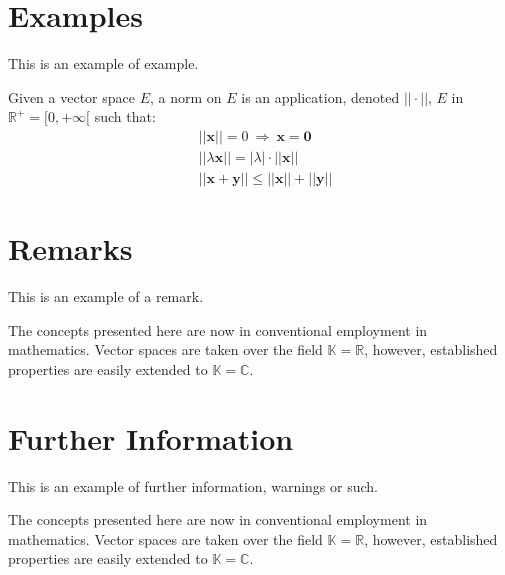 \documentclass{udc-book}
\begin{document}

\section{Examples}

This is an example of example.

\begin{example}
Given a vector space $E$, a norm on $E$ is an application, denoted $||\cdot||$, $E$ in $\mathbb{R}^+=[0,+\infty[$ such that:
\begin{align}
& ||\mathbf{x}||=0\ \Rightarrow\ \mathbf{x}=\mathbf{0}\\
& ||\lambda \mathbf{x}||=|\lambda|\cdot ||\mathbf{x}||\\
& ||\mathbf{x}+\mathbf{y}||\leq ||\mathbf{x}||+||\mathbf{y}||
\end{align}
\end{example}


\section{Remarks}

This is an example of a remark.

\begin{remark}
The concepts presented here are now in conventional employment in mathematics. Vector spaces are taken over the field $\mathbb{K}=\mathbb{R}$, however, established properties are easily extended to $\mathbb{K}=\mathbb{C}$.
\end{remark}


\section{Further Information}

This is an example of further information, warnings or such.

\begin{furtherinfo}
The concepts presented here are now in conventional employment in mathematics. Vector spaces are taken over the field $\mathbb{K}=\mathbb{R}$, however, established properties are easily extended to $\mathbb{K}=\mathbb{C}$.
\end{furtherinfo}
\end{document}
